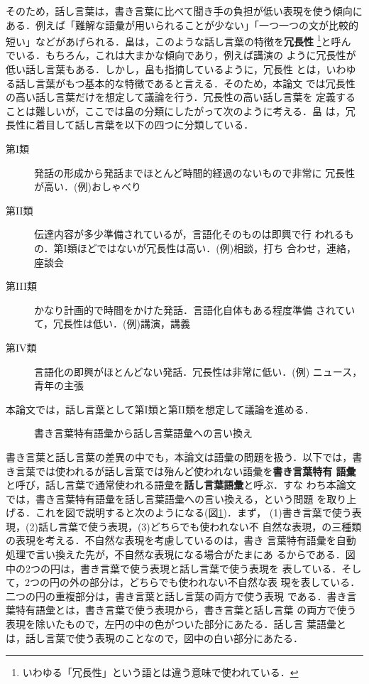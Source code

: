 \documentclass{nlp}
\begin{document}
そのため，話し言葉は，書き言葉に比べて聞き手の負担が低い表現を使う傾向に
ある．例えば「難解な語彙が用いられることが少ない」「一つ一つの文が比較的
短い」などがあげられる．畠は，このような話し言葉の特徴を{\bf 冗長性}
\footnote{いわゆる「冗長性」という語とは違う意味で使われている．}と呼ん
でいる\cite{Hatake87}．もちろん，これは大まかな傾向であり，例えば講演の
ように冗長性が低い話し言葉もある．しかし，畠も指摘しているように，冗長性
とは，いわゆる話し言葉がもつ基本的な特徴であると言える．そのため，本論文
では冗長性の高い話し言葉だけを想定して議論を行う．冗長性の高い話し言葉を
定義することは難しいが，ここでは畠の分類にしたがって次のように考える．畠
は，冗長性に着目して話し言葉を以下の四つに分類している\cite{Hatake87}．
\begin{description}
 \item[第I類] 発話の形成から発話までほとんど時間的経過のないもので非常に
	    冗長性が高い．(例)おしゃべり
 \item[第II類] 伝達内容が多少準備されているが，言語化そのものは即興で行
	    われるもの．第I類ほどではないが冗長性は高い．(例)相談，打ち
	    合わせ，連絡，座談会
 \item[第III類] かなり計画的で時間をかけた発話．言語化自体もある程度準備
	    されていて，冗長性は低い．(例)講演，講義
 \item[第IV類] 言語化の即興がほとんどない発話．冗長性は非常に低い．(例)
	    ニュース，青年の主張
\end{description}
本論文では，話し言葉として第I類と第II類を想定して議論を進める．


\begin{figure}[h]
 \begin{center}
 \end{center}
 \caption{書き言葉特有語彙から話し言葉語彙への言い換え}
 \label{fig:task}
\end{figure}

書き言葉と話し言葉の差異の中でも，本論文は語彙の問題を扱う．以下では，書
き言葉では使われるが話し言葉では殆んど使われない語彙を{\bf 書き言葉特有
語彙}と呼び，話し言葉で通常使われる語彙を{\bf 話し言葉語彙}と呼ぶ．すな
わち本論文では，書き言葉特有語彙を話し言葉語彙への言い換える，という問題
を取り上げる．これを図で説明すると次のようになる(図\ref{fig:task})．まず，
(1)書き言葉で使う表現，(2)話し言葉で使う表現，(3)どちらでも使われない不
自然な表現，の三種類の表現を考える．不自然な表現を考慮しているのは，書き
言葉特有語彙を自動処理で言い換えた先が，不自然な表現になる場合がたまにあ
るからである．図中の2つの円は，書き言葉で使う表現と話し言葉で使う表現を
表している．そして，2つの円の外の部分は，どちらでも使われない不自然な表
現を表している．二つの円の重複部分は，書き言葉と話し言葉の両方で使う表現
である．書き言葉特有語彙とは，書き言葉で使う表現から，書き言葉と話し言葉
の両方で使う表現を除いたもので，左円の中の色がついた部分にあたる．話し言
葉語彙とは，話し言葉で使う表現のことなので，図中の白い部分にあたる．
\end{document}
